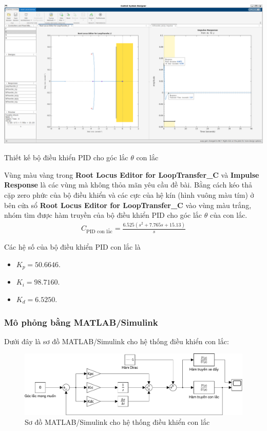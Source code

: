 \documentclass[12pt,a4paper]{article}
\begin{document}
\begin{center}
    \captionsetup{type=figure}
    \includegraphics[width=\linewidth]{thiet_ke_PID_con_lac.png}
    \caption{Thiết kế bộ điều khiển PID cho góc lắc $\theta$ con lắc}
\end{center}

Vùng màu vàng trong \textbf{Root Locus Editor for LoopTransfer\_C} và  \textbf{Impulse Response} là các vùng mà không thỏa mãn yêu cầu đề bài. Bằng cách kéo thả cặp zero phức của bộ điều khiển và các cực của hệ kín (hình vuông màu tím) ở bên cửa sổ \textbf{Root Locus Editor for LoopTransfer\_C} vào vùng màu trắng, nhóm tìm được hàm truyền của bộ điều khiển PID cho góc lắc $\theta$ của con lắc.
\begin{align}
    C_{\text{PID con lắc}} = \frac{6.525 (s^2 + 7.765s + 15.13)}{s}
\end{align}

Các hệ số của bộ điều khiển PID con lắc là
\begin{itemize}
    \item $K_p = 50.6646$.
    \item $K_i = 98.7160$.
    \item $K_d = 6.5250$.
\end{itemize}


\subsubsection{Mô phỏng bằng MATLAB/Simulink}

Dưới đây là sơ đồ MATLAB/Simulink cho hệ thống điều khiển con lắc: 
\begin{figure}[ht]
    \centering
    \includegraphics[width=\linewidth]{MATLAB_4.pdf}
    \caption{Sơ đồ MATLAB/Simulink cho hệ thống điều khiển con lắc}
\end{figure}
\end{document}
